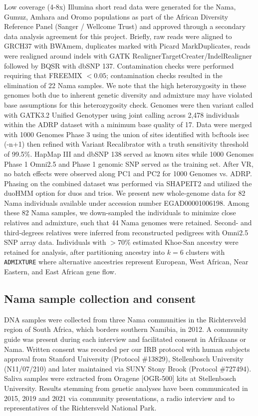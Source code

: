 \documentclass[]{article}
\begin{document}
Low coverage (4-8x) Illumina short read data were generated for the Nama,
Gumuz, Amhara and Oromo populations as part of the African Diversity Reference
Panel (Sanger / Wellcome Trust) \citep{Gurdasani2015-qy,Pagani2015-pz} and
approved through a secondary data analysis agreement for this project. Briefly,
raw reads were aligned to GRCH37 with BWAmem, duplicates
marked with Picard MarkDuplicates, reads were realigned around indels with GATK
RealignerTargetCreater/IndelRealigner followed by BQSR with dbSNP 137.
Contamination checks were performed requiring that FREEMIX $<0.05$;
contamination checks resulted in the elimination of 22 Nama samples. We note
that the high heterozygosity in these genomes both due to inherent genetic
diversity and admixture may have violated base assumptions for this
heterozygosity check. Genomes were then variant called with GATK3.2 Unified
Genotyper \citep{DePristo2011-up} using joint calling across 2,478 individuals within
the ADRP dataset with a minimum base quality of 17. Data were merged with 1000
Genomes Phase 3 \citep{1000_Genomes_Project_Consortium2015-zq} using the union
of sites identified with bcftools isec (-n+1) \citep{Danecek2021-kc} then refined
with Variant Recalibrator with a truth sensitivity threshold of 99.5\%. HapMap
III and dbSNP 138 served as known sites while 1000 Genomes Phase 1 Omni2.5 and
Phase 1 genomic SNP served as the training set. After VR, no batch effects were
observed along PC1 and PC2 for 1000 Genomes vs. ADRP. Phasing on the combined
dataset was performed via SHAPEIT2 \citep{Delaneau2013-aw} and utilized the duoHMM
option for duos and trios. We present new whole-genome data for 82 Nama individuals 
available under accession number EGAD00001006198.
Among these 82 Nama samples, we down-sampled the individuals to minimize
close relatives and admixture, such that 44 Nama genomes were retained.
Second- and third-degrees relatives were inferred from reconstructed
pedigrees with Omni2.5 SNP array data.
Individuals with $>70\%$ estimated Khoe-San ancestry were retained for
analysis, after partitioning ancestry into $k=6$ clusters with \texttt{ADMIXTURE}
\citep{Alexander2009-sw} where alternative ancestries represent European, West
African, Near Eastern, and East African gene flow. 

\subsection{Nama sample collection and consent}

DNA samples were collected from three Nama communities in the Richtersveld
region of South Africa, which borders southern Namibia, in 2012. A community
guide was present during each interview and facilitated consent in Afrikaans or
Nama. Written consent was recorded per our IRB protocol with human subjects
approval from Stanford University (Protocol \#13829), Stellenbosch University
(N11/07/210) and later maintained via SUNY Stony Brook (Protocol \#727494).
Saliva samples were extracted from Oragene [OGR-500] kits at Stellenbosch
University. Results stemming from genetic analyses have been communicated in
2015, 2019 and 2021 via community presentations, a radio interview and to
representatives of the Richtersveld National Park.
\end{document}
